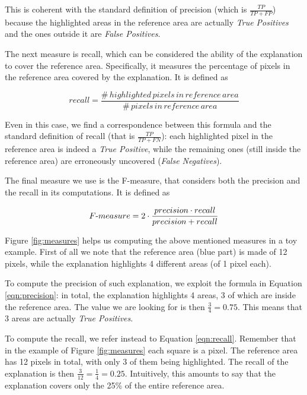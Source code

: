 \documentclass[12pt, twoside, a4paper]{report}
\begin{document}
This is coherent with the standard definition of precision (which is $\frac{TP}{TP+FP}$) because the highlighted areas in the reference area are actually \textit{True Positives} and the ones outside it are \textit{False Positives}.

The next measure is recall, which can be considered the ability of the explanation to cover the reference area. Specifically, it measures the percentage of pixels in the reference area covered by the explanation. It is defined as

\begin{equation}
recall = 
\frac
	{\#\,highlighted\,pixels\,in\,reference\,area}
	{\#\,pixels\,in\,reference\,area}
     \label{eqn:recall}
\end{equation}

Even in this case, we find a correspondence between this formula and the standard definition of recall (that is $\frac{TP}{TP+FN}$): each highlighted pixel in the reference area is indeed a \textit{True Positive}, while the remaining ones (still inside the reference area) are erroneously uncovered (\textit{False Negatives}).

The final measure we use is the F-measure, that considers both the precision and the recall in its computations. It is defined as 

\begin{equation}
F\textnormal{-}measure = 
	2 \cdot \frac
	    {precision \cdot recall}
        {precision + recall} 
\label{eqn:fmeasure}
\end{equation}

Figure \ref{fig:measures} helps us computing the above mentioned measures in a toy example. First of all we note that the reference area (blue part) is made of 12 pixels, while the explanation highlights 4 different areas (of 1 pixel each). 

To compute the precision of such explanation, we exploit the formula in Equation \ref{eqn:precision}: in total, the explanation highlights 4 areas, 3 of which are inside the reference area. The value we are looking for is then $\frac{3}{4} = 0.75$. This means that 3 areas are actually \textit{True Positives}. 

To compute the recall, we refer instead to Equation	\ref{eqn:recall}. Remember that in the example of Figure 	\ref{fig:measures} each square is a pixel. The reference area has 12 pixels in total, with only 3 of them being highlighted. The recall of the explanation is then $\frac{3}{12} = \frac{1}{4} = 0.25$. Intuitively, this amounts to say that the explanation covers only the 25\% of the entire reference area.
\end{document}
